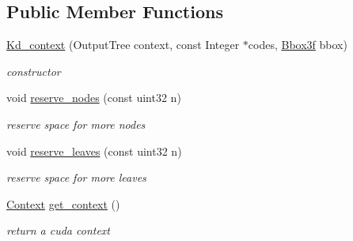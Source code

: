 \subsection*{\-Public \-Member \-Functions}
\begin{DoxyCompactItemize}
\item 
\hypertarget{structnih_1_1cuda_1_1kd_1_1_kd__context_abe9c4314aef3ed1a35933de2d1cbb42a}{
\hyperlink{structnih_1_1cuda_1_1kd_1_1_kd__context_abe9c4314aef3ed1a35933de2d1cbb42a}{\-Kd\-\_\-context} (\-Output\-Tree context, const \-Integer $\ast$codes, \hyperlink{structnih_1_1_bbox}{\-Bbox3f} bbox)}
\label{structnih_1_1cuda_1_1kd_1_1_kd__context_abe9c4314aef3ed1a35933de2d1cbb42a}

\begin{DoxyCompactList}\small\item\em constructor \end{DoxyCompactList}\item 
\hypertarget{structnih_1_1cuda_1_1kd_1_1_kd__context_a0a3ff0a6c3183ae567dcea906240cfb3}{
void \hyperlink{structnih_1_1cuda_1_1kd_1_1_kd__context_a0a3ff0a6c3183ae567dcea906240cfb3}{reserve\-\_\-nodes} (const uint32 n)}
\label{structnih_1_1cuda_1_1kd_1_1_kd__context_a0a3ff0a6c3183ae567dcea906240cfb3}

\begin{DoxyCompactList}\small\item\em reserve space for more nodes \end{DoxyCompactList}\item 
\hypertarget{structnih_1_1cuda_1_1kd_1_1_kd__context_ab7385013e4f09f265ad7627b487d43ce}{
void \hyperlink{structnih_1_1cuda_1_1kd_1_1_kd__context_ab7385013e4f09f265ad7627b487d43ce}{reserve\-\_\-leaves} (const uint32 n)}
\label{structnih_1_1cuda_1_1kd_1_1_kd__context_ab7385013e4f09f265ad7627b487d43ce}

\begin{DoxyCompactList}\small\item\em reserve space for more leaves \end{DoxyCompactList}\item 
\hypertarget{structnih_1_1cuda_1_1kd_1_1_kd__context_a55edd27ba21a537108ecf6f5ed0468a5}{
\hyperlink{structnih_1_1cuda_1_1kd_1_1_kd__context_1_1_context}{\-Context} \hyperlink{structnih_1_1cuda_1_1kd_1_1_kd__context_a55edd27ba21a537108ecf6f5ed0468a5}{get\-\_\-context} ()}
\label{structnih_1_1cuda_1_1kd_1_1_kd__context_a55edd27ba21a537108ecf6f5ed0468a5}

\begin{DoxyCompactList}\small\item\em return a cuda context \end{DoxyCompactList}\end{DoxyCompactItemize}
